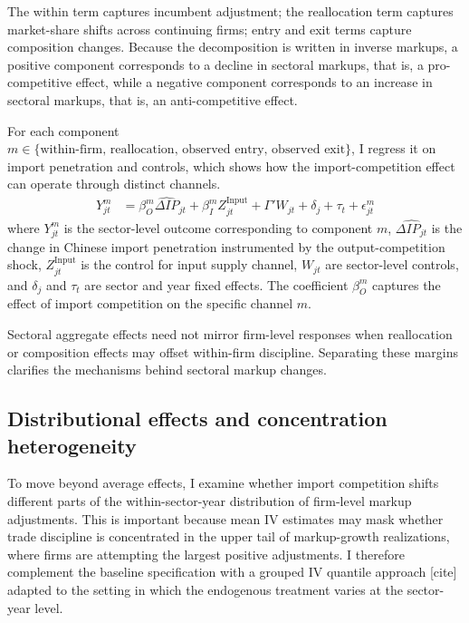 \documentclass[12pt]{article}
\newcommand{\textcite}[2][]{[cite]}
\begin{document}
The within term captures incumbent adjustment; the reallocation term captures market-share shifts across continuing firms; entry and exit terms capture composition changes. Because the decomposition is written in inverse markups, a positive component corresponds to a decline in sectoral markups, that is, a pro-competitive effect, while a negative component corresponds to an increase in sectoral markups, that is, an anti-competitive effect.

For each component $m \in \{ \text{within-firm, reallocation, observed entry, observed exit} \}$, I regress it on import penetration and controls, which shows how the import-competition effect can operate through distinct channels. 
\begin{equation}
\begin{aligned}
    Y^m_{jt} &= \beta_O^m \widehat{\Delta IP}_{jt} + \beta_I^m Z_{jt}^{\text{Input}} + \Gamma' W_{jt} + \delta_j + \tau_t + \epsilon_{jt}^m
\end{aligned}
\end{equation}
where $Y^m_{jt}$ is the sector-level outcome corresponding to component $m$, $\widehat{\Delta IP_{jt}}$ is the change in Chinese import penetration instrumented by the output-competition shock, $Z_{jt}^{\text{Input}}$ is the control for input supply channel, $W_{jt}$ are sector-level controls, and $\delta_j$ and $\tau_t$ are sector and year fixed effects. The coefficient $\beta_O^m$ captures the effect of import competition on the specific channel $m$.

Sectoral aggregate effects need not mirror firm-level responses when reallocation or composition effects may offset within-firm discipline. Separating these margins clarifies the mechanisms behind sectoral markup changes. 

\subsection{Distributional effects and concentration heterogeneity}
\label{sec:distributional}

To move beyond average effects, I examine whether import competition shifts different parts of the within-sector-year distribution of firm-level markup adjustments. This is important because mean IV estimates may mask whether trade discipline is concentrated in the upper tail of markup-growth realizations, where firms are attempting the largest positive adjustments. I therefore complement the baseline specification with a grouped IV quantile approach \textcite{chetverikovIVQuantileRegression2016} adapted to the setting in which the endogenous treatment varies at the sector-year level.
\end{document}
